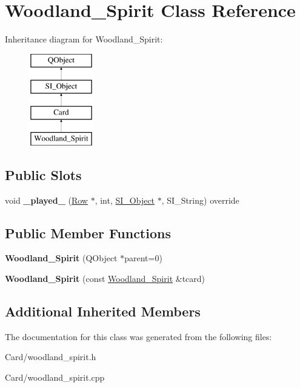 \hypertarget{class_woodland___spirit}{}\section{Woodland\+\_\+\+Spirit Class Reference}
\label{class_woodland___spirit}
Inheritance diagram for Woodland\+\_\+\+Spirit\+:\begin{figure}[H]
\begin{center}
\leavevmode
\includegraphics[height=4.000000cm]{class_woodland___spirit}
\end{center}
\end{figure}
\subsection*{Public Slots}
\begin{DoxyCompactItemize}
\item 
\mbox{\label{class_woodland___spirit_a91384a70e1ebb45aecc9f99b9b30af6b}} 
void {\bfseries \+\_\+played\+\_\+} (\hyperlink{class_card_set}{Row} $\ast$, int, \hyperlink{class_s_i___object}{S\+I\+\_\+\+Object} $\ast$, S\+I\+\_\+\+String) override
\end{DoxyCompactItemize}
\subsection*{Public Member Functions}
\begin{DoxyCompactItemize}
\item 
\mbox{\label{class_woodland___spirit_ab3fa34b107f6b26726d2a2c94761c002}} 
{\bfseries Woodland\+\_\+\+Spirit} (Q\+Object $\ast$parent=0)
\item 
\mbox{\label{class_woodland___spirit_a560afebda99c93b68f66cef1abc8a10c}} 
{\bfseries Woodland\+\_\+\+Spirit} (const \hyperlink{class_woodland___spirit}{Woodland\+\_\+\+Spirit} \&tcard)
\end{DoxyCompactItemize}
\subsection*{Additional Inherited Members}


The documentation for this class was generated from the following files\+:\begin{DoxyCompactItemize}
\item 
Card/woodland\+\_\+spirit.\+h\item 
Card/woodland\+\_\+spirit.\+cpp\end{DoxyCompactItemize}
